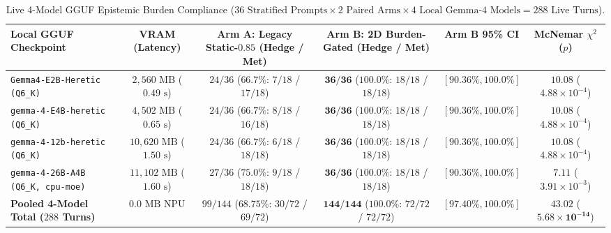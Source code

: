 \documentclass[11pt,a4paper]{article}
\begin{document}
\begin{table}[h]
\centering
\caption{Live 4-Model GGUF Epistemic Burden Compliance ($36\text{ Stratified Prompts} \times 2\text{ Paired Arms} \times 4\text{ Local Gemma-4 Models} = 288\text{ Live Turns}$).}
\label{tab:live_4model_web_burden}
\begin{tabular}{lccccc}
\toprule
\textbf{Local GGUF Checkpoint} & \textbf{VRAM (Latency)} & \textbf{Arm A: Legacy Static-$0.85$ (Hedge / Met)} & \textbf{Arm B: 2D Burden-Gated (Hedge / Met)} & \textbf{Arm B 95\% CI} & \textbf{McNemar $\chi^2$ ($p$)} \\
\midrule
\texttt{Gemma4-E2B-Heretic (Q6\_K)} & $2{,}560\text{ MB}$ ($0.49\text{ s}$) & $24/36$ ($66.7\%$: $7/18$ / $17/18$) & $\mathbf{36/36}$ ($\mathbf{100.0\%}$: $18/18$ / $18/18$) & $[90.36\%, 100.0\%]$ & $10.08$ ($4.88 \times 10^{-4}$) \\
\texttt{gemma-4-E4B-heretic (Q6\_K)} & $4{,}502\text{ MB}$ ($0.65\text{ s}$) & $24/36$ ($66.7\%$: $8/18$ / $16/18$) & $\mathbf{36/36}$ ($\mathbf{100.0\%}$: $18/18$ / $18/18$) & $[90.36\%, 100.0\%]$ & $10.08$ ($4.88 \times 10^{-4}$) \\
\texttt{gemma-4-12b-heretic (Q6\_K)} & $10{,}620\text{ MB}$ ($1.50\text{ s}$) & $24/36$ ($66.7\%$: $6/18$ / $18/18$) & $\mathbf{36/36}$ ($\mathbf{100.0\%}$: $18/18$ / $18/18$) & $[90.36\%, 100.0\%]$ & $10.08$ ($4.88 \times 10^{-4}$) \\
\texttt{gemma-4-26B-A4B (Q6\_K, cpu-moe)} & $11{,}102\text{ MB}$ ($1.60\text{ s}$) & $27/36$ ($75.0\%$: $9/18$ / $18/18$) & $\mathbf{36/36}$ ($\mathbf{100.0\%}$: $18/18$ / $18/18$) & $[90.36\%, 100.0\%]$ & $7.11$ ($3.91 \times 10^{-3}$) \\
\midrule
\textbf{Pooled 4-Model Total ($288$ Turns)} & $0.0\text{ MB}$ NPU & $99/144$ ($68.75\%$: $30/72$ / $69/72$) & $\mathbf{144/144}$ ($\mathbf{100.0\%}$: $72/72$ / $72/72$) & $[97.40\%, 100.0\%]$ & $\mathbf{43.02}$ ($\mathbf{5.68 \times 10^{-14}}$) \\
\bottomrule
\end{tabular}
\end{table}
\end{document}
